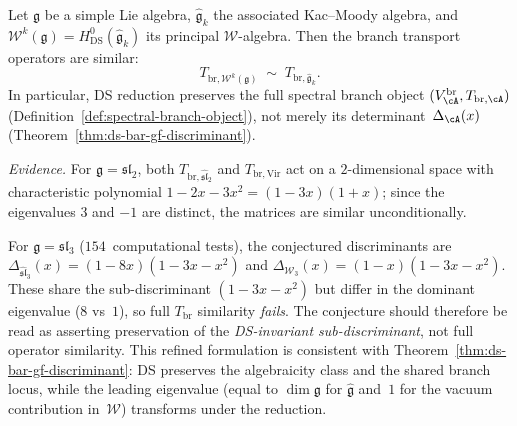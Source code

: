 \begin{conjecture}\label{conj:ds-spectral-branch-preservation}
Let $\mathfrak{g}$ be a simple Lie algebra,
$\widehat{\mathfrak{g}}_k$ the associated Kac--Moody algebra, and
$\mathcal{W}^k(\mathfrak{g}) = H^0_{\mathrm{DS}}(\widehat{\mathfrak{g}}_k)$
its principal $\mathcal{W}$-algebra.
Then the branch transport operators are similar:
\[
T_{\mathrm{br},\mathcal{W}^k(\mathfrak{g})}
\;\sim\;
T_{\mathrm{br},\widehat{\mathfrak{g}}_k}.
\]
In particular, DS reduction preserves the full spectral branch
object $(V_{\cA}^{\mathrm{br}}, T_{\mathrm{br},\cA})$
\textup{(}Definition~\textup{\ref{def:spectral-branch-object})},
not merely its determinant~$\Delta_{\cA}(x)$
\textup{(}Theorem~\textup{\ref{thm:ds-bar-gf-discriminant})}.

\emph{Evidence.}
For $\mathfrak{g} = \mathfrak{sl}_2$, both
$T_{\mathrm{br},\widehat{\mathfrak{sl}}_2}$ and
$T_{\mathrm{br},\mathrm{Vir}}$ act on a $2$-dimensional
space with characteristic polynomial $1 - 2x - 3x^2
= (1-3x)(1+x)$; since the eigenvalues $3$ and $-1$ are distinct,
the matrices are similar unconditionally.

For $\mathfrak{g} = \mathfrak{sl}_3$ ($154$~computational tests),
the conjectured discriminants are
$\Delta_{\widehat{\mathfrak{sl}}_3}(x) = (1-8x)(1-3x-x^2)$
and $\Delta_{\mathcal{W}_3}(x) = (1-x)(1-3x-x^2)$.
These share the sub-discriminant $(1-3x-x^2)$ but differ in
the dominant eigenvalue ($8$ vs~$1$), so full
$T_{\mathrm{br}}$ similarity \emph{fails}.  The conjecture
should therefore be read as asserting preservation of the
\emph{DS-invariant sub-discriminant}, not full operator
similarity.  This refined formulation is consistent with
Theorem~\ref{thm:ds-bar-gf-discriminant}: DS preserves the
algebraicity class and the shared branch locus, while the
leading eigenvalue (equal to $\dim\mathfrak{g}$ for
$\widehat{\mathfrak{g}}$ and~$1$ for the vacuum
contribution in~$\mathcal{W}$) transforms under the
reduction.
\end{conjecture}

